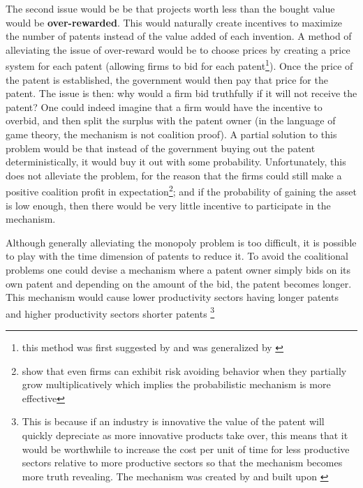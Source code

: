 \documentclass[12pt]{report}
\numberwithin{equation}{section}
\begin{document}
The second issue would be be that projects worth less than the bought value would be \textbf{over-rewarded}. This would naturally create incentives to maximize the number of patents instead of the value added of each invention. A method of alleviating the issue of over-reward would be to choose prices by creating a price system for each patent (allowing firms to bid for each patent\footnote{this method was first suggested by \cite{kremer_1998} and was generalized by \cite{weyl2012market}}). Once the price of the patent is established, the government would then pay that price for the patent. The issue is then: why would a firm bid truthfully if it will not receive the patent? One could indeed imagine that a firm would have the incentive to overbid, and then split the surplus with the patent owner (in the language of game theory, the mechanism is not coalition proof). A partial solution to this problem would be that instead of the government buying out the patent deterministically, it would buy it out with some probability. Unfortunately, this does not alleviate the problem, for the reason that the firms could still make a positive coalition profit in expectation\footnote{\cite{peters2018time} show that even firms can exhibit risk avoiding behavior when they partially grow multiplicatively which implies the probabilistic mechanism is more effective}; and if the probability of gaining the asset is low enough, then there would be very little incentive to participate in the mechanism. 

Although generally alleviating the monopoly problem is too difficult, it is possible to play with the time dimension of patents to reduce it. To avoid the coalitional problems one could devise a mechanism where a patent owner simply bids on its own patent and depending on the amount of the bid, the patent becomes longer. This mechanism would cause lower productivity sectors having longer patents and higher productivity sectors shorter patents \footnote{ This is because if an industry is innovative the value of the patent will quickly depreciate as more innovative products take over, this means that it would be worthwhile to increase the cost per unit of time for less productive sectors relative to more productive sectors so that the mechanism becomes more truth revealing. The mechanism was created by \cite{Scotchmer1999} and built upon \cite{Cornelli1999}}
\end{document}
